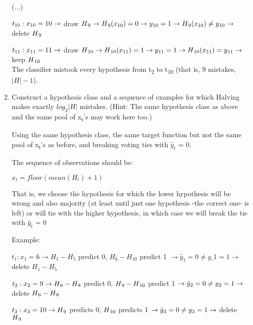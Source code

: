 \documentclass{article}
\begin{document}
\begin{enumerate}
(...)

$t\textsubscript{10}: x\textsubscript{10} = 10 \rightarrow$ draw $H\textsubscript{9} \rightarrow H\textsubscript{9}(x\textsubscript{10}) = 0 \rightarrow y\textsubscript{10} = 1 \rightarrow H\textsubscript{9}(x\textsubscript{10}) \neq y\textsubscript{10} \rightarrow $ delete $H\textsubscript{9}$

$t\textsubscript{11}: x\textsubscript{11} = 11 \rightarrow$ draw $H\textsubscript{10} \rightarrow H\textsubscript{10}(x\textsubscript{11}) = 1 \rightarrow y\textsubscript{11} = 1 \rightarrow H\textsubscript{10}(x\textsubscript{11}) = y\textsubscript{11} \rightarrow $ keep $H\textsubscript{10}$\\

The classifier mistook every hypothesis from t\textsubscript{2} to t\textsubscript{10} (that is, 9 mistakes, $|H| - 1$).

\item Construct a hypothesis class and a sequence of examples for which
Halving makes exactly $log_2 |H|$ mistakes. (Hint: The same hypothesis
class as above and the same pool of x\textsubscript{t}'s may work here too.)

Using the same hypothesis class, the same target function but not the same pool of x\textsubscript{t}'s as before, and breaking voting ties with $\hat{y}_t$ = 0.

The sequence of observations should be:

$x_t = floor(mean(H_t)+1)$

That is, we choose the hypothesis for which the lower hypothesis will be wrong and also majority (at least until just one hypothesis -the correct one- is left) or will tie with the higher hypothesis, in which case we will break the tie with $\hat{y}_t$ = 0

Example:

$t_1: x_1 = 6 \rightarrow H_1 - H_5$ predict 0, $H_6 - H_{10}$ predict 1 $\rightarrow \hat{y}_1 = 0 \neq y\_1 = 1 \rightarrow$ delete $ H_1 - H_5$

$t\textsubscript{2}: x\textsubscript{2} = 9 \rightarrow H\textsubscript{6} - H\textsubscript{8}$ predict 0, $H\textsubscript{9} - H\textsubscript{10}$ predict 1 $\rightarrow \hat{y}\textsubscript{2} = 0 \neq y\textsubscript{2} = 1 \rightarrow$ delete $ H\textsubscript{6} - H\textsubscript{8}$

$t\textsubscript{3}: x\textsubscript{3} = 10 \rightarrow H\textsubscript{9}$ predicts 0, $H\textsubscript{10}$ predicts 1 $\rightarrow \hat{y}\textsubscript{3} = 0 \neq y\textsubscript{3} = 1 \rightarrow$ delete $ H\textsubscript{9}$


\end{enumerate}
\end{document}
